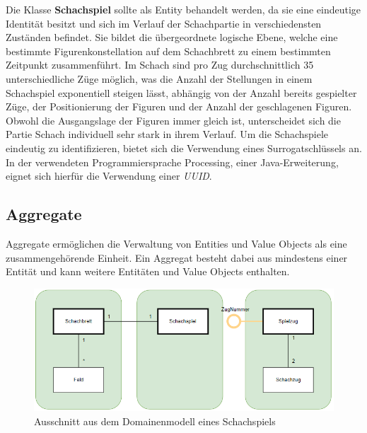 Die Klasse \textbf{Schachspiel} sollte als Entity behandelt werden, da sie eine eindeutige Identität besitzt und sich im Verlauf der Schachpartie in verschiedensten Zuständen befindet. 
Sie bildet die übergeordnete logische Ebene, welche eine bestimmte Figurenkonstellation auf dem Schachbrett zu einem bestimmten Zeitpunkt zusammenführt. 
Im Schach sind pro Zug durchschnittlich 35 unterschiedliche Züge möglich, was die Anzahl der Stellungen in einem Schachspiel exponentiell steigen lässt, abhängig von der Anzahl bereits gespielter Züge, der Positionierung der Figuren und der Anzahl der geschlagenen Figuren. 
Obwohl die Ausgangslage der Figuren immer gleich ist, unterscheidet sich die Partie Schach individuell sehr stark in ihrem Verlauf.
Um die Schachspiele eindeutig zu identifizieren, bietet sich die Verwendung eines Surrogatschlüssels an.
In der verwendeten Programmiersprache Processing, einer Java-Erweiterung, eignet sich hierfür die Verwendung einer \textit{UUID}.

\subsection{Aggregate}

Aggregate ermöglichen die Verwaltung von Entities und Value Objects als eine zusammengehörende Einheit.
Ein Aggregat besteht dabei aus mindestens einer Entität und kann weitere Entitäten und Value Objects enthalten.

\begin{figure}[ht!]
    \centering
    \includegraphics*[scale=0.6]{Bilder/DDD_Aggregate_v2.PNG}
    \caption{Ausschnitt aus dem Domainenmodell eines Schachspiels}
\end{figure}


